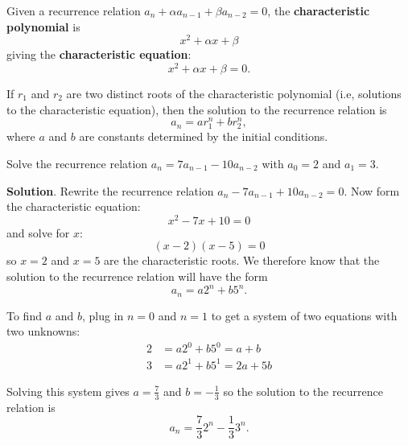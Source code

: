 \documentclass[11pt,]{book}
\newcommand{\terminology}[1]{\textbf{#1}}
\theoremstyle{ptxplainnotitle}
\theoremstyle{ptxplaintitle}
\theoremstyle{ptxdefinitionnotitle}
\theoremstyle{ptxdefinitiontitle}
\theoremstyle{ptxdefinitionnotitle}
\theoremstyle{ptxdefinitiontitle}
\theoremstyle{ptxdefinitionnotitle}
\theoremstyle{ptxdefinitiontitle}
\theoremstyle{ptxdefinitiontitlenonumber}
\theoremstyle{ptxdefinitiontitlenonumber}
\numberwithin{equation}{chapter}
\newcommand{\amp}{&}
\begin{document}
\begin{assemblage}\label{assemblage-6}
\hypertarget{p-476}{}%
 Given a recurrence relation \(a_n + \alpha a_{n-1} + \beta a_{n-2} = 0\), the \terminology{characteristic polynomial} is%
\begin{equation*}
x^2 + \alpha x + \beta
\end{equation*}
giving the \terminology{characteristic equation}:%
\begin{equation*}
x^2 + \alpha x + \beta = 0.
\end{equation*}
%
\par
\hypertarget{p-477}{}%
If \(r_1\) and \(r_2\) are two distinct roots of the characteristic polynomial (i.e, solutions to the characteristic equation), then the solution to the recurrence relation is%
\begin{equation*}
a_n = ar_1^n + br_2^n,
\end{equation*}
where \(a\) and \(b\) are constants determined by the initial conditions.%
\end{assemblage}
\begin{example}\label{example-23}
\hypertarget{p-478}{}%
Solve the recurrence relation \(a_n = 7a_{n-1} - 10 a_{n-2}\) with \(a_0 = 2\) and \(a_1 = 3\).%
\par\smallskip%
\noindent\textbf{Solution}.\hypertarget{solution-64}{}\quad%
\hypertarget{p-479}{}%
Rewrite the recurrence relation \(a_n - 7a_{n-1} + 10a_{n-2} = 0\). Now form the characteristic equation:%
\begin{equation*}
x^2 - 7x + 10 = 0
\end{equation*}
and solve for \(x\):%
\begin{equation*}
(x - 2) (x - 5) = 0
\end{equation*}
so \(x = 2\) and \(x = 5\) are the characteristic roots. We therefore know that the solution to the recurrence relation will have the form%
\begin{equation*}
a_n = a 2^n + b 5^n.
\end{equation*}
%
\par
\hypertarget{p-480}{}%
To find \(a\) and \(b\), plug in \(n =0\) and \(n = 1\) to get a system of two equations with two unknowns:%
\begin{align*}
2 \amp = a 2^0 + b 5^0 = a + b\\
3 \amp = a 2^1 + b 5^1 = 2a + 5b
\end{align*}
%
\par
\hypertarget{p-481}{}%
Solving this system gives \(a = \frac{7}{3}\) and \(b = -\frac{1}{3}\) so the solution to the recurrence relation is%
\begin{equation*}
a_n = \frac{7}{3}2^n - \frac{1}{3} 3^n.
\end{equation*}
%
\end{example}
\end{document}

